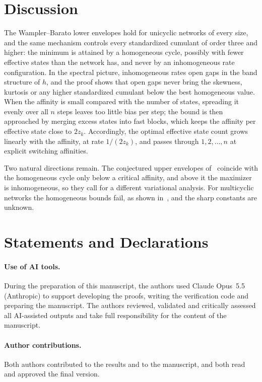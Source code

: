 \documentclass[11pt]{article}
\theoremstyle{remark}
\begin{document}
\section{Discussion}
The Wampler--Barato lower envelopes hold for unicyclic networks of every
size, and the same mechanism controls every standardized cumulant of order
three and higher: the minimum is attained by a homogeneous cycle, possibly
with fewer effective states than the network has, and never by an
inhomogeneous rate configuration. In the spectral picture, inhomogeneous
rates open gaps in the band structure of $h$, and the proof shows that open
gaps never bring the skewness, kurtosis or any higher standardized cumulant
below the best homogeneous value. When the affinity is small compared with
the number of states, spreading it evenly over all $n$ steps leaves too
little bias per step; the bound is then approached by merging excess states
into fast blocks, which keeps the affinity per effective state close to
$2z_k$. Accordingly, the optimal effective state count grows linearly with
the affinity, at rate $1/(2z_k)$, and passes through $1,2,\dots,n$ at
explicit switching affinities.

Two natural directions remain. The conjectured upper envelopes of~\cite{wb}
coincide with the homogeneous cycle only below a critical affinity, and
above it the maximizer is inhomogeneous, so they call for a different
variational analysis. For multicyclic networks the homogeneous bounds fail,
as shown in~\cite{wb}, and the sharp constants are unknown.

\section*{Statements and Declarations}

\paragraph{Use of AI tools.} During the preparation of this manuscript, the authors used Claude
Opus~5.5 (Anthropic) to support developing the proofs, writing the
verification code and preparing the manuscript. The authors reviewed,
validated and critically assessed all AI-assisted outputs and take full
responsibility for the content of the manuscript.

\paragraph{Author contributions.} Both authors contributed to the results and
to the manuscript, and both read and approved the final version.
\end{document}
